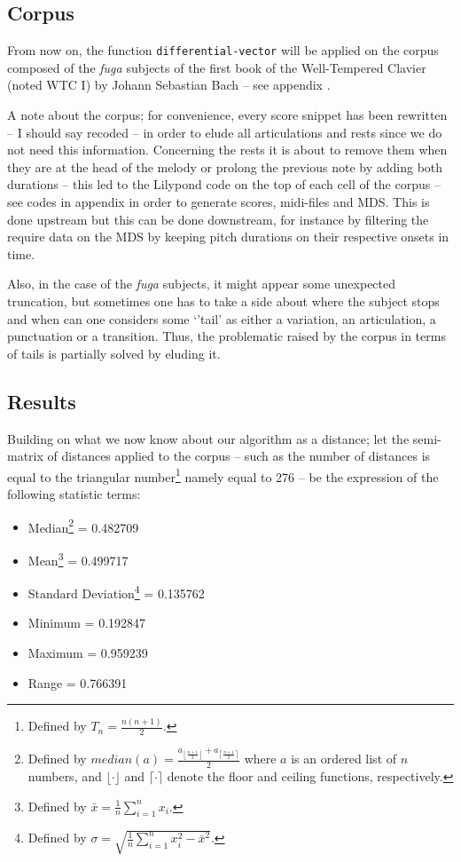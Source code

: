  \subsection{Corpus}
 
 From now on, the function \texttt{differential-vector} will be applied on the corpus composed of the \textit{fuga} subjects of the first book of the Well-Tempered Clavier (noted WTC I) by Johann Sebastian Bach -- see appendix .

\smallskip

A note about the corpus; for convenience, every score snippet has been rewritten -- I should say recoded -- in order to elude all articulations and rests since we do not need this information. Concerning the rests it is about to remove them when they are at the head of the melody or prolong the previous note by adding both durations -- this led to the Lilypond code on the top of each cell of the corpus -- see codes in appendix  in order to generate scores, midi-files and MDS. This is done upstream but this can be done downstream, for instance by filtering the require data on the MDS by keeping pitch durations on their respective onsets in time. 

\smallskip

Also, in the case of the \textit{fuga} subjects, it might appear some unexpected truncation, but sometimes one has to take a side about where the subject stops and when can one considers some `'tail' as either a variation, an articulation, a punctuation or a transition. Thus, the problematic raised by the corpus in terms of tails is partially solved by eluding it.

\subsection{Results}

Building on what we now know about our algorithm as a distance; let the semi-matrix of distances applied to the corpus -- such as the number of distances is equal to the triangular number\footnote{Defined by $T_n=\displaystyle\frac{n(n+1)}{2}$.} namely equal to 276 -- be the expression of the following statistic terms:

\begin{itemize}
\item[] Median\footnote{Defined by $median(a)=\displaystyle\frac{a_{\left \lfloor{\frac{n+1}{2}}\right \rfloor } + a_{\left \lceil{\frac{n+1}{2}}\right \rceil }}{2}$ where $a$ is an ordered list of $n$ numbers, and $\displaystyle \lfloor \cdot \rfloor$  and $\displaystyle \lceil \cdot \rceil$  denote the floor and ceiling functions, respectively.}  = 0.482709
\item[] Mean\footnote{Defined by $\bar{x}=\displaystyle\frac{1}{n}\sum_{i=1}^n x_i$.}  = 0.499717
\item[] Standard Deviation\footnote{Defined by $\sigma=\displaystyle\sqrt{\frac{1}{n}\sum_{i=1}^n x^2_i - \bar{x}^2}$.}  =  0.135762
\item[] Minimum = 0.192847 
\item[] Maximum = 0.959239
\item[] Range = 0.766391
\end{itemize}

